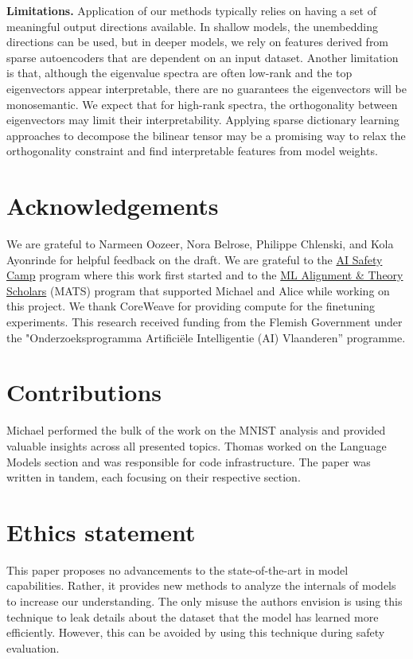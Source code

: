 \documentclass{article} %
\begin{document}
\textbf{Limitations.} Application of our methods typically relies on having a set of meaningful output directions available. In shallow models, the unembedding directions can be used, but in deeper models, we rely on features derived from sparse autoencoders that are dependent on an input dataset. Another limitation is that, although the eigenvalue spectra are often low-rank and the top eigenvectors appear interpretable, there are no guarantees the eigenvectors will be monosemantic. We expect that for high-rank spectra, the orthogonality between eigenvectors may limit their interpretability. Applying sparse dictionary learning approaches to decompose the bilinear tensor may be a promising way to relax the orthogonality constraint and find interpretable features from model weights.


\section*{Acknowledgements}
We are grateful to Narmeen Oozeer, Nora Belrose, Philippe Chlenski, and Kola Ayonrinde for helpful feedback on the draft. We are grateful to the \href{https://aisafety.camp/}{AI Safety Camp} program where this work first started and to the \href{https://https://www.matsprogram.org/}{ML Alignment \& Theory Scholars} (MATS) program that supported Michael and Alice while working on this project. We thank CoreWeave for providing compute for the finetuning experiments. This research received funding from the Flemish Government under the "Onderzoeksprogramma Artificiële Intelligentie (AI) Vlaanderen” programme.

\section*{Contributions}
Michael performed the bulk of the work on the MNIST analysis and provided valuable insights across all presented topics. Thomas worked on the Language Models section and was responsible for code infrastructure. The paper was written in tandem, each focusing on their respective section.

\section*{Ethics statement}
This paper proposes no advancements to the state-of-the-art in model capabilities. Rather, it provides new methods to analyze the internals of models to increase our understanding. The only misuse the authors envision is using this technique to leak details about the dataset that the model has learned more efficiently. However, this can be avoided by using this technique during safety evaluation.
\end{document}
